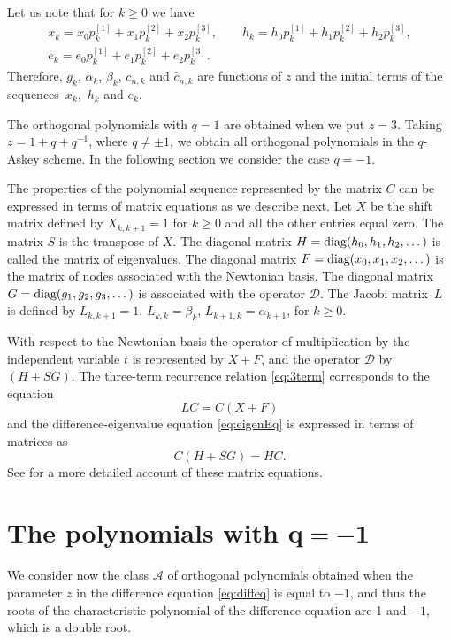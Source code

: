\documentclass[10pt,a4paper]{amsart}
\def\cA{\mathcal A}
\def\cD{\mathcal D}
\def\diag{\hbox{diag}}
\numberwithin{equation}{section}
\begin{document}
Let us note that for $k \ge 0$ we have
\begin{gather*}%
	x_k = x_0 p^{[1]}_k + x_1 p^{[2]}_k + x_2 p^{[3]}_k, \qquad
	h_k = h_0 p^{[1]}_k + h_1 p^{[2]}_k + h_2 p^{[3]}_k, \\
	e_k = e_0 p^{[1]}_k + e_1 p^{[2]}_k + e_2 p^{[3]}_k.
\end{gather*}
Therefore, $g_k$, $\alpha_k$, $\beta_k$, $c_{n,k}$ and ${\hat c}_{n,k}$ are functions of $z$ and the initial terms of the sequences~$x_k$,~$h_k$ and $e_k$.

The orthogonal polynomials with $q=1$ are obtained when we put $z=3$.
Taking $z=1+ q+q^{-1}$, where $q\ne \pm 1$, we obtain all orthogonal polynomials in the $q$-Askey scheme. In the following section we consider the case $q=-1$.

The properties of the polynomial sequence represented by the matrix $C$ can be expressed in terms of matrix equations as we describe next.
Let $X$ be the shift matrix defined by $X_{k,k+1}=1$ for $k\ge 0$ and all the other entries equal zero.
 The matrix $S$ is the transpose of $X$. The diagonal matrix $H=\diag(h_0,h_1,h_2,\dots)$ is called the matrix of eigenvalues. The diagonal matrix $F=\diag(x_0,x_1,x_2,\dots)$ is the matrix of nodes associated with the Newtonian basis. The diagonal matrix $G=\diag(g_1,g_2,g_3,\dots)$ is associated with the operator $\cD$. The Jacobi matrix~$L$ is defined by $L_{k,k+1}=1$, $L_{k,k}=\beta_k$, $L_{k+1,k}=\alpha_{k+1}$, for $k\ge 0$.

 With respect to the Newtonian basis the operator of multiplication by the independent variable $t$ is represented by $ X+F$, and the operator $\cD$ by $( H + S G)$.
 The three-term recurrence relation \eqref{eq:3term} corresponds to the equation
 \begin{equation*}%
	 LC=C(X+F)
 \end{equation*}
and the difference-eigenvalue equation \eqref{eq:eigenEq} is expressed in terms of matrices as
\begin{equation*}%
	C(H+SG)=HC.
\end{equation*}
See \cite{Uni} for a more detailed account of these matrix equations.


\section[The polynomials with q=-1]{The polynomials with $\boldsymbol{q=-1}$}\label{section3}

We consider now the class $\cA$ of orthogonal polynomials obtained when the parameter $z$ in the difference equation \eqref{eq:diffeq} is equal to $-1$, and thus the roots of the characteristic polynomial of the difference equation are 1 and $-1$, which is a double root.
\end{document}
